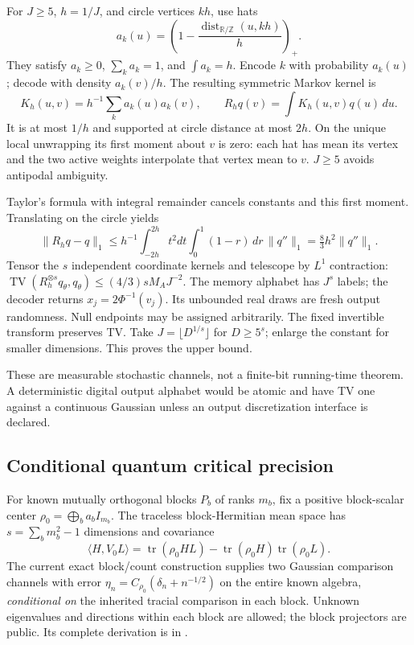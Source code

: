 \documentclass[11pt]{article}
\theoremstyle{definition}
\DeclareMathOperator{\tr}{tr}
\DeclareMathOperator{\TV}{TV}
\newcommand{\R}{\mathbb R}
\begin{document}
For $J\ge5$, $h=1/J$, and circle vertices $kh$, use hats
\[
 a_k(u)=\left(1-\frac{\operatorname{dist}_{\R/\mathbb Z}(u,kh)}h\right)_+.
\]
They satisfy $a_k\ge0$, $\sum_ka_k=1$, and $\int a_k=h$.
Encode $k$ with probability $a_k(u)$; decode with density $a_k(v)/h$.
The resulting symmetric Markov kernel is
\[
 K_h(u,v)=h^{-1}\sum_ka_k(u)a_k(v),\qquad
 R_hq(v)=\int K_h(u,v)q(u)\,du.
\]
It is at most $1/h$ and supported at circle distance at most $2h$.
On the unique local unwrapping its first moment about $v$ is zero:
each hat has mean its vertex and the two active weights interpolate
that vertex mean to $v$. $J\ge5$ avoids antipodal ambiguity.

Taylor's formula with integral remainder cancels constants and this
first moment. Translating on the circle yields
\[
 \|R_hq-q\|_1
 \le h^{-1}\int_{-2h}^{2h}t^2dt
 \int_0^1(1-r)\,dr\,\|q''\|_1
 =\tfrac83h^2\|q''\|_1.
\]
Tensor the $s$ independent coordinate kernels and telescope by
$L^1$ contraction:
$\TV(R_h^{\otimes s}q_\theta,q_\theta)
\le(4/3)sM_AJ^{-2}$.
The memory alphabet has $J^s$ labels; the decoder returns
$x_j=2\Phi^{-1}(v_j)$. Its unbounded real draws are fresh output
randomness. Null endpoints may be assigned arbitrarily.
The fixed invertible transform preserves TV.
Take $J=\lfloor D^{1/s}\rfloor$ for $D\ge5^s$; enlarge the
constant for smaller dimensions. This proves the upper bound.

These are measurable stochastic channels, not a finite-bit
running-time theorem. A deterministic digital output alphabet would
be atomic and have TV one against a continuous Gaussian unless an
output discretization interface is declared.

\subsection{Conditional quantum critical precision}
For known mutually orthogonal blocks $P_b$ of ranks $m_b$, fix a
positive block-scalar center
$\rho_0=\bigoplus_ba_bI_{m_b}$.
The traceless block-Hermitian mean space has
$s=\sum_bm_b^2-1$ dimensions and covariance
\[
 \langle H,V_0L\rangle
 =\tr(\rho_0HL)-\tr(\rho_0H)\tr(\rho_0L).
\]
The current exact block/count construction supplies two Gaussian
comparison channels with error
$\eta_n=C_{\rho_0}(\delta_n+n^{-1/2})$ on the entire known algebra,
\emph{conditional on} the inherited tracial comparison in each block.
Unknown eigenvalues and directions within each block are allowed;
the block projectors are public. Its complete derivation is in
.
\end{document}
